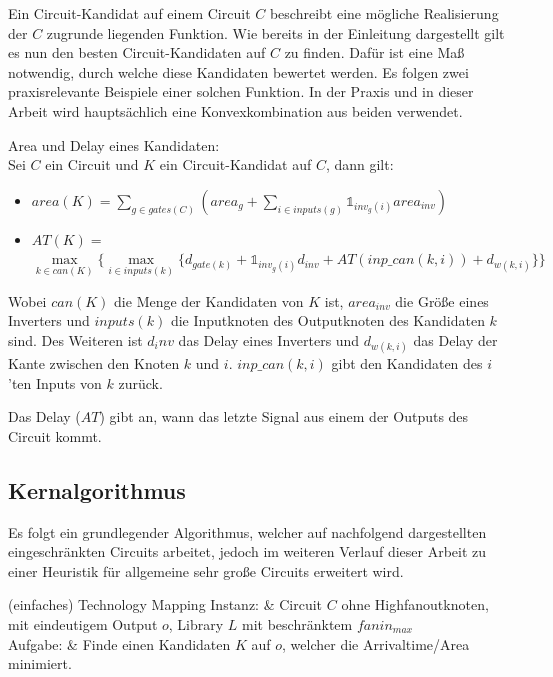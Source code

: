 \documentclass[11pt, a4paper, german]{article}
\begin{document}
Ein Circuit-Kandidat auf einem Circuit $C$ beschreibt eine mögliche Realisierung der $C$ zugrunde liegenden Funktion.  Wie bereits in der Einleitung dargestellt gilt es nun den besten Circuit-Kandidaten auf $C$ zu finden. Dafür ist eine Maß notwendig, durch welche diese Kandidaten bewertet werden. Es folgen zwei praxisrelevante Beispiele einer solchen Funktion. In der Praxis und in dieser Arbeit wird hauptsächlich eine Konvexkombination aus beiden verwendet.

\begin{definition}{Area und Delay eines Kandidaten:}\\
\label{def:area_delay}
Sei $C$ ein Circuit und $K$ ein Circuit-Kandidat auf $C$, dann gilt: \\
\begin{itemize}
\item $area(K) = \sum_{g \in gates(C)} (area_g + \sum_{i \in inputs(g)} \mathbb{1}_{inv_g(i)} area_{inv})$ 
\item $AT(K) = $\\$  \max\limits_{k \in can(K)} \{\max\limits_{i \in inputs(k)} \{   d_{gate(k)} + \mathbb{1}_{inv_g(i)} d_{inv} + AT(inp\_can(k,i)) + d_{w(k,i)} \} \}$ 
\end{itemize}
Wobei $can(K)$ die Menge der Kandidaten von $K$ ist, $area_{inv}$ die Größe eines Inverters und $inputs(k)$ die Inputknoten des Outputknoten des Kandidaten $k$ sind. Des Weiteren ist $d_inv$ das Delay eines Inverters und $d_{w(k,i)} $ das Delay der Kante zwischen den Knoten $k$ und $i$. $inp\_can(k,i)$ gibt den Kandidaten des $i$'ten Inputs von $k$ zurück. 

\end{definition}

Das Delay ($AT$) gibt an, wann das letzte Signal aus einem der Outputs des Circuit kommt.

\subsection{Kernalgorithmus}
\label{subsec:kern_algorithmus}

Es folgt ein grundlegender Algorithmus, welcher auf nachfolgend dargestellten eingeschränkten Circuits arbeitet, jedoch im weiteren Verlauf dieser Arbeit zu einer Heuristik für allgemeine sehr große Circuits erweitert wird.

\begin{problem}[framed]{(einfaches) Technology Mapping}
  Instanz:  & Circuit $C$ ohne Highfanoutknoten, mit eindeutigem Output $o$, Library $L$ mit beschr\"anktem $fanin_{max}$\\
  Aufgabe: &  Finde einen Kandidaten $K$ auf $o$, welcher die Arrivaltime/Area minimiert.
\end{problem}
\end{document}
